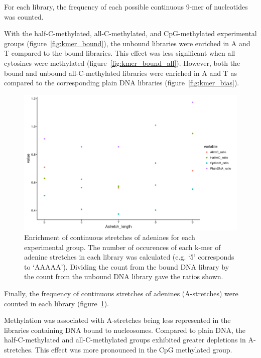 \documentclass[parskip=full, numbers=noenddot]{scrreprt}
\begin{document}
For each library, the frequency of each possible continuous 9-mer of nucleotides was counted.

With the half-C-methylated, all-C-methylated, and CpG-methylated experimental groups (figure~\ref{fig:kmer_bound}), the unbound libraries were enriched in A and T compared to the bound libraries.  This effect was less significant when all cytosines were methylated (figure~\ref{fig:kmer_bound_all}).  However, both the bound and unbound all-C-methylated libraries were enriched in A and T as compared to the corresponding plain DNA libraries (figure~\ref{fig:kmer_bias}). %

\begin{figure}[htpb]
  \centering
  \includegraphics[width=\textwidth]{astretch}
  \caption{Enrichment of continuous stretches of adenines for each experimental group.  The number of occurences of each k-mer of adenine stretches in each library was calculated (e.g. `5' corresponds to `AAAAA').  Dividing the count from the bound DNA library by the count from the unbound DNA library gave the ratios shown.}
  \label{fig:astretch}
\end{figure}

Finally, the frequency of continuous stretches of adenines (A-stretches) were counted in each library (figure~\ref{fig:astretch}).

Methylation was associated with A-stretches being less represented in the libraries containing DNA bound to nucleosomes.  Compared to plain DNA, the half-C-methylated and all-C-methylated groups exhibited greater depletions in A-stretches.  This effect was more pronounced in the CpG methylated group.
\end{document}
